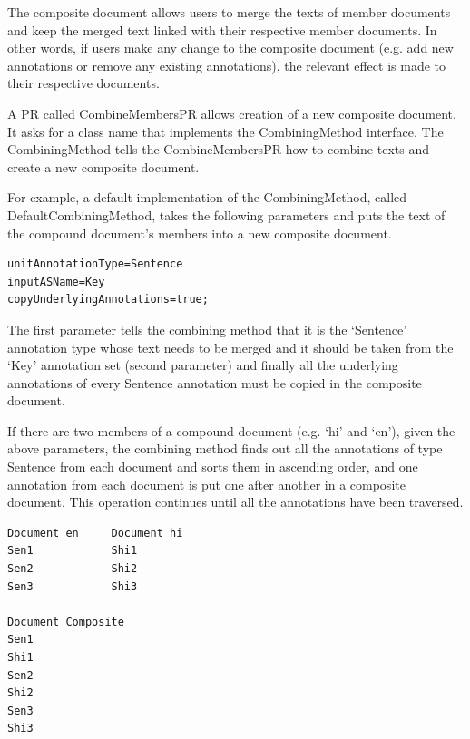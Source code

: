 
The composite document allows users to merge the texts of member documents and 
keep the merged text linked with their respective member documents.  In other 
words, if users make any change to the composite document (e.g. add new 
annotations or remove any existing annotations), the relevant effect is made to 
their respective documents.

A PR called CombineMembersPR allows creation of a new composite
document.  It asks for a class name that implements the
CombiningMethod interface.  The CombiningMethod tells the
CombineMembersPR how to combine texts and create a new composite
document.

For example, a default implementation of the CombiningMethod, called
DefaultCombiningMethod, takes the following parameters and puts the
text of the compound document's members into a new composite document.

\begin{small}\begin{verbatim}
unitAnnotationType=Sentence
inputASName=Key
copyUnderlyingAnnotations=true;
\end{verbatim}\end{small}

The first parameter tells the combining method that it is the `Sentence'
annotation type whose text needs to be merged and it should be taken from the
`Key' annotation set (second parameter) and finally all the underlying
annotations of every Sentence annotation must be copied in the composite
document.

If there are two members of a compound document (e.g. `hi' and
`en'), given the above parameters, the combining method finds out
all the annotations of type Sentence from each document and sorts them
in ascending order, and one annotation from each document is put one
after another in a composite document. This operation continues until
all the annotations have been traversed.

\begin{small}\begin{verbatim}
Document en     Document hi
Sen1            Shi1
Sen2            Shi2
Sen3            Shi3

Document Composite
Sen1
Shi1
Sen2
Shi2
Sen3
Shi3
\end{verbatim}\end{small}

